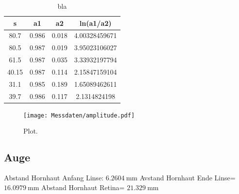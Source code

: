 \begin{table}
\centering
\caption{bla}
\label{tab:daempf}
\begin{tabular}{cccc}
  \toprule
s & a1 & a2 & ln(a1/a2) \\
\midrule
80.7 & 0.986 & 0.018 & 4.00328459671 \\
80.5 & 0.987 & 0.019 & 3.95023106027 \\
61.5 & 0.987 & 0.035 & 3.33932197794 \\
40.15 & 0.987 & 0.114 & 2.15847159104 \\
31.1 & 0.985 & 0.189 & 1.65089462611 \\
39.7 & 0.986 & 0.117 & 2.1314824198 \\
\bottomrule
\end{tabular}
\end{table}

\begin{figure}
  \centering
  \texttt{[image: Messdaten/amplitude.pdf]}
  \caption{Plot.}
  \label{fig:daempf}
\end{figure}
\FloatBarrier

\subsection{Auge}

Abstand Hornhaut Anfang Linse:  $\SI{6,2604}{\milli\meter}$
Avstand Hornhaut Ende Linse=  $\SI{16,0979}{\milli\meter}$
Abstand Hornhaut Retina=  $\SI{21,329}{\milli\meter}$
